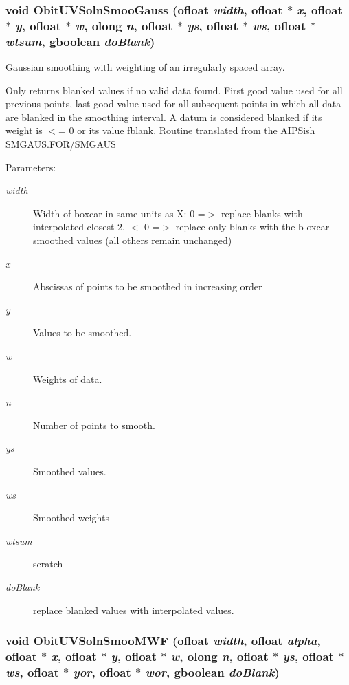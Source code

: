 \subsubsection{\setlength{\rightskip}{0pt plus 5cm}void Obit\-UVSoln\-Smoo\-Gauss ({\bf ofloat} {\em width}, {\bf ofloat} $\ast$ {\em x}, {\bf ofloat} $\ast$ {\em y}, {\bf ofloat} $\ast$ {\em w}, {\bf olong} {\em n}, {\bf ofloat} $\ast$ {\em ys}, {\bf ofloat} $\ast$ {\em ws}, {\bf ofloat} $\ast$ {\em wtsum}, gboolean {\em do\-Blank})}\label{ObitUVSoln_8h_a33}


Gaussian smoothing with weighting of an irregularly spaced array. 

Only returns blanked values if no valid data found. First good value used for all previous points, last good value used for all subsequent points in which all data are blanked in the smoothing interval. A datum is considered blanked if its weight is $<$= 0 or its value fblank. Routine translated from the AIPSish SMGAUS.FOR/SMGAUS \begin{Desc}
\item[Parameters:]
\begin{description}
\item[{\em width}]Width of boxcar in same units as X: 0 =$>$ replace blanks with interpolated closest 2, $<$ 0 =$>$ replace only blanks with the b oxcar smoothed values (all others remain unchanged) \item[{\em x}]Abscissas of points to be smoothed in increasing order \item[{\em y}]Values to be smoothed. \item[{\em w}]Weights of data. \item[{\em n}]Number of points to smooth. \item[{\em ys}]Smoothed values. \item[{\em ws}]Smoothed weights \item[{\em wtsum}]scratch \item[{\em do\-Blank}]replace blanked values with interpolated values. \end{description}
\end{Desc}
\subsubsection{\setlength{\rightskip}{0pt plus 5cm}void Obit\-UVSoln\-Smoo\-MWF ({\bf ofloat} {\em width}, {\bf ofloat} {\em alpha}, {\bf ofloat} $\ast$ {\em x}, {\bf ofloat} $\ast$ {\em y}, {\bf ofloat} $\ast$ {\em w}, {\bf olong} {\em n}, {\bf ofloat} $\ast$ {\em ys}, {\bf ofloat} $\ast$ {\em ws}, {\bf ofloat} $\ast$ {\em yor}, {\bf ofloat} $\ast$ {\em wor}, gboolean {\em do\-Blank})}\label{ObitUVSoln_8h_a34}


